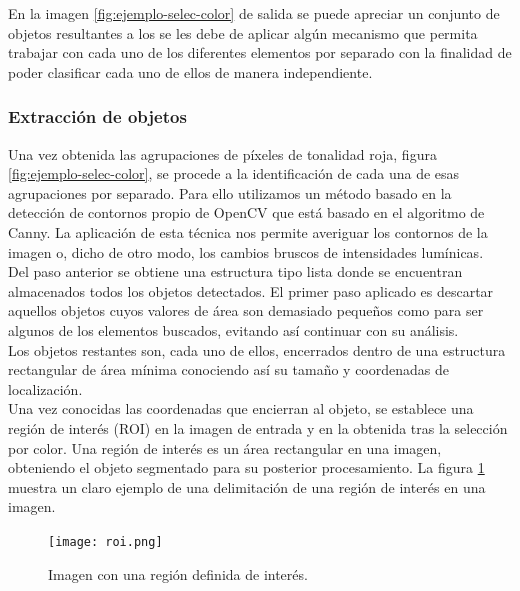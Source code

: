 En la imagen \ref{fig:ejemplo-selec-color} de salida se puede apreciar un conjunto de objetos resultantes a los se les debe de aplicar algún mecanismo que permita trabajar con cada uno de los diferentes elementos por separado con la finalidad de poder clasificar cada uno de ellos de manera independiente.

\subsubsection {Extracción de objetos}
\label{sec:extraccion-objetos}

Una vez obtenida las agrupaciones de píxeles de tonalidad roja, figura \ref{fig:ejemplo-selec-color}, se procede a la identificación de cada una de esas agrupaciones por separado. Para ello utilizamos un método basado en la detección de contornos propio de OpenCV que está basado en el algoritmo de Canny. La aplicación de esta técnica nos permite averiguar los contornos de la imagen o, dicho de otro modo, los cambios bruscos de intensidades lumínicas.\\

Del paso anterior se obtiene una estructura tipo lista donde se encuentran almacenados todos los objetos detectados. El primer paso aplicado es descartar aquellos objetos cuyos valores de área son demasiado pequeños como para ser algunos de los elementos buscados, evitando así continuar con su análisis.\\

Los objetos restantes son, cada uno de ellos, encerrados dentro de una estructura rectangular de área mínima conociendo así su tamaño y coordenadas de localización.\\

Una vez conocidas las coordenadas que encierran al objeto, se establece una región de interés (ROI) en la imagen de entrada y en la obtenida tras la selección por color. Una región de interés es un área rectangular en una imagen, obteniendo el objeto segmentado para su posterior procesamiento. La figura \ref{fig:roi} muestra un claro ejemplo de una delimitación de una región de interés en una imagen.\\

\begin{figure}[H]
  \begin{center}
    \texttt{[image: roi.png]}
  \end{center}
  \caption{Imagen con una región definida de interés.}
  \label{fig:roi}
\end{figure}

